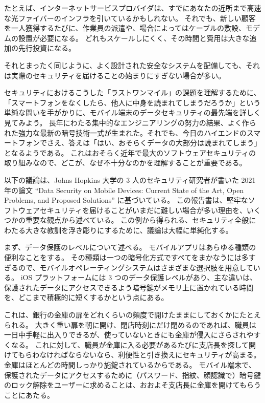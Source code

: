 \documentclass[uplatex]{jsarticle}
\def\label#1{}%
\begin{document}
\begin{exa}[インターネットサービスプロバイダのラストワンマイル]\label{exa:ch14-isp-last-mile}
たとえば、インターネットサービスプロバイダは、すでにあなたの近所まで高速な光ファイバーのインフラを引いているかもしれない。
それでも、新しい顧客を一人獲得するたびに、作業員の派遣や、場合によってはケーブルの敷設、モデムの設置が必要になる。
どれもスケールしにくく、その時間と費用は大きな追加の先行投資になる。
\end{exa}

それとまったく同じように、よく設計された安全なシステムを配備しても、それは実際のセキュリティを届けることの始まりにすぎない場合が多い。

セキュリティにおけるこうした「ラストワンマイル」の課題を理解するために、「スマートフォンをなくしたら、他人に中身を読まれてしまうだろうか」という単純な問いを手がかりに、モバイル端末のデータセキュリティの最先端を詳しく見てみよう。
長年にわたる集中的なエンジニアリングの努力の結果、よく作られた強力な最新の暗号技術一式が生まれた。それでも、今日のハイエンドのスマートフォンでさえ、答えは「はい、おそらくデータの大部分は読まれてしまう」となるようである。
これはおそらく近年で最大のソフトウェアセキュリティの取り組みなので、どこが、なぜ不十分なのかを理解することが重要である。

以下の議論は、Johns Hopkins 大学の 3 人のセキュリティ研究者が書いた 2021 年の論文 ``Data Security on Mobile Devices: Current State of the Art, Open Problems, and Proposed Solutions'' に基づいている。
この報告書は、堅牢なソフトウェアセキュリティを届けることがいまだに難しい場合が多い理由を、いくつかの重要な観点から述べている。
この例から得られる、セキュリティ全般にわたる大きな教訓を浮き彫りにするために、議論は大幅に単純化する。

まず、データ保護のレベルについて述べる。
モバイルアプリはあらゆる種類の便利なことをする。
その種類は一つの暗号化方式ですべてをまかなうには多すぎるので、モバイルオペレーティングシステムはさまざまな選択肢を用意している。
iOS プラットフォームには 3 つのデータ保護レベルがあり、主な違いは、保護されたデータにアクセスできるよう暗号鍵がメモリ上に置かれている時間を、どこまで積極的に短くするかという点にある。

\begin{exa}[銀行の金庫の扉]\label{exa:ch14-bank-vault-door}
これは、銀行の金庫の扉をどれくらいの頻度で開けたままにしておくかにたとえられる。
大きく重い扉を朝に開け、閉店時刻にだけ閉めるのであれば、職員は一日中手軽に出入りできるが、使っていないときにも金庫が侵入にさらされやすくなる。
これに対して、職員が金庫に入る必要があるたびに支店長を探して開けてもらわなければならないなら、利便性と引き換えにセキュリティが高まる。
金庫はほとんどの時間しっかり施錠されているからである。
モバイル端末で、保護されたデータにアクセスするために（パスワード、指紋、顔認識で）暗号鍵のロック解除をユーザーに求めることは、おおよそ支店長に金庫を開けてもらうことにあたる。
\end{exa}
\end{document}

